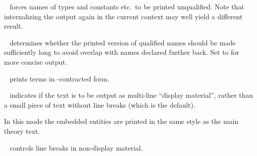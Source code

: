 \begin{isabellebody}
\begin{isamarkuptext}
\begin{description}
  \item {}\hypertarget{antiquotation option.names-short}{\hyperlink{antiquotation option.names-short}{\mbox{}}}~
  forces names of types and constants etc.\ to be printed unqualified.
  Note that internalizing the output again in the current context may
  well yield a different result.

  \item {}\hypertarget{antiquotation option.names-unique}{\hyperlink{antiquotation option.names-unique}{\mbox{}}}~
  determines whether the printed version of qualified names should be
  made sufficiently long to avoid overlap with names declared further
  back.  Set to  for more concise output.

  \item {}\hypertarget{antiquotation option.eta-contract}{\hyperlink{antiquotation option.eta-contract}{\mbox{}}}~
  prints terms in -contracted form.

  \item {}\hypertarget{antiquotation option.display}{\hyperlink{antiquotation option.display}{\mbox{}}}~ indicates
  if the text is to be output as multi-line ``display material'',
  rather than a small piece of text without line breaks (which is the
  default).

  In this mode the embedded entities are printed in the same style as
  the main theory text.

  \item {}\hypertarget{antiquotation option.break}{\hyperlink{antiquotation option.break}{\mbox{}}}~ controls
  line breaks in non-display material.


\end{description}
\end{isamarkuptext}
\end{isabellebody}
